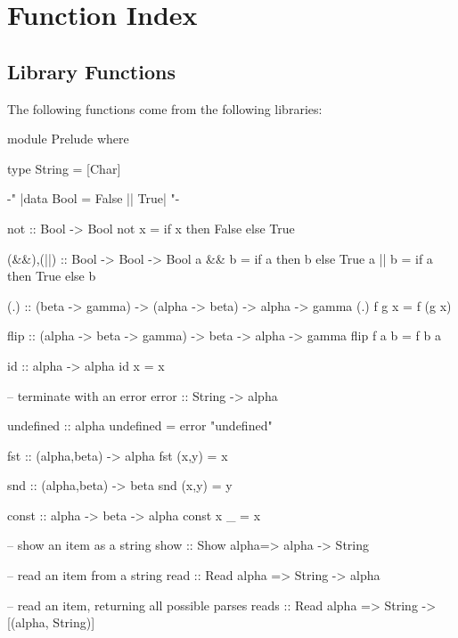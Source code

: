 
\chapter{Function Index}




\printindex


\section{Library Functions}

\begin{comment}
\begin{code}
import Prelude(Char,Show,Eq(..),Int,Num(..),Ord(..),otherwise,repeat,Read,Bool(..))
data IO a = IO a
instance Monad IO
\end{code}
\end{comment}


The following functions come from the following libraries:

\begin{code}
module Prelude where

type String = [Char]

{-" |data Bool = False || True| "-}

not :: Bool -> Bool
not x = if x then False else True

(&&),(||) :: Bool -> Bool -> Bool
a && b = if a then b else True
a || b = if a then True else b

(.) :: (beta -> gamma) -> (alpha -> beta) -> alpha -> gamma
(.) f g x = f (g x)

flip :: (alpha -> beta -> gamma) -> beta -> alpha -> gamma
flip f a b = f b a

id :: alpha -> alpha
id x = x

-- terminate with an error
error :: String -> alpha

undefined :: alpha
undefined = error "undefined"

fst :: (alpha,beta) -> alpha
fst (x,y) = x

snd :: (alpha,beta) -> beta
snd (x,y) = y

const :: alpha -> beta -> alpha
const x _ =  x

-- show an item as a string
show :: Show alpha=> alpha -> String

-- read an item from a string
read :: Read alpha => String -> alpha

-- read an item, returning all possible parses
reads :: Read alpha => String -> [(alpha, String)]
\end{code}

